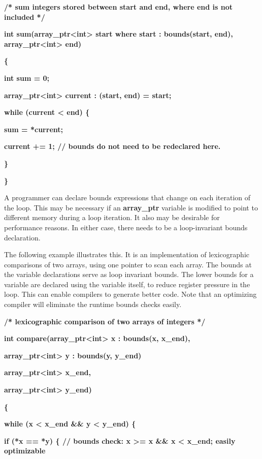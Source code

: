 \documentclass[]{article}
\begin{document}
\textbf{/* sum integers stored between start and end, where end is not
included */}

\textbf{int sum(array\_ptr\textless{}int\textgreater{} start where start
: bounds(start, end), array\_ptr\textless{}int\textgreater{} end)}

\textbf{\{ }

\textbf{int sum = 0;}

\textbf{array\_ptr\textless{}int\textgreater{} current : (start, end) =
start;}

\textbf{while (current \textless{} end) \{}

\textbf{sum = *current;}

\textbf{current += 1; // bounds do not need to be redeclared here.}

\textbf{\}}

\textbf{\}}

A programmer can declare bounds expressions that change on each
iteration of the loop. This may be necessary if an \textbf{array\_ptr}
variable is modified to point to different memory during a loop
iteration. It also may be desirable for performance reasons. In either
case, there needs to be a loop-invariant bounds declaration.

The following example illustrates this. It is an implementation of
lexicographic comparisons of two arrays, using one pointer to scan each
array. The bounds at the variable declarations serve as loop invariant
bounds. The lower bounds for a variable are declared using the variable
itself, to reduce register pressure in the loop. This can enable
compilers to generate better code. Note that an optimizing compiler will
eliminate the runtime bounds checks easily.

\textbf{/* lexicographic comparison of two arrays of integers */}

\textbf{int compare(array\_ptr\textless{}int\textgreater{} x : bounds(x,
x\_end), }

\textbf{array\_ptr\textless{}int\textgreater{} y : bounds(y, y\_end)}

\textbf{array\_ptr\textless{}int\textgreater{} x\_end,}

\textbf{array\_ptr\textless{}int\textgreater{} y\_end)}

\textbf{\{ }

\textbf{while (x \textless{} x\_end \&\& y \textless{} y\_end) \{}

\textbf{if (*x == *y) \{ // bounds check: x \textgreater{}= x \&\& x
\textless{} x\_end; easily optimizable}
\end{document}
